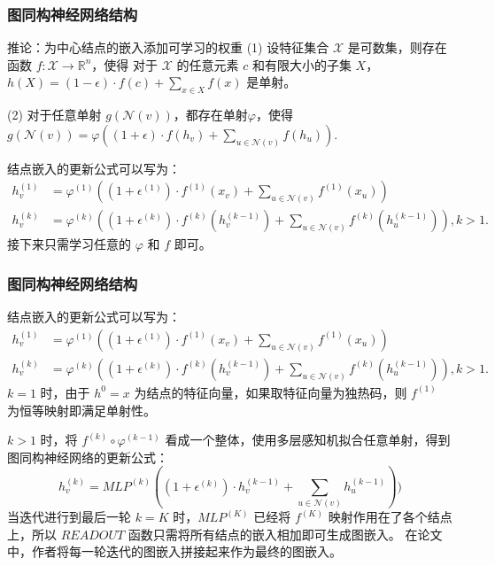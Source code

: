 \documentclass{beamer}
\begin{document}
\begin{frame}

  \frametitle{图同构神经网络结构}
  \begin{alertblock}{推论：为中心结点的嵌入添加可学习的权重}
    (1) 设特征集合 $\mathcal{X}$ 是可数集，则存在函数 $f: \mathcal{X} \rightarrow \mathbb{R}^n$，使得
    对于 $\mathcal{X}$ 的任意元素 $c$ 和有限大小的子集 $X$，$h(X) = (1 - \epsilon) \cdot f(c) + \sum_{x \in X} f(x)$ 是单射。
    
    (2) 对于任意单射 $g(\mathcal{N}(v))$，都存在单射$\varphi$，使得 $g(\mathcal{N}(v)) = \varphi((1 + \epsilon) \cdot f(h_v) + \sum_{u \in \mathcal{N}(v)} f(h_u))$.
  \end{alertblock}
  结点嵌入的更新公式可以写为：
  \begin{align*}
    h_v^{(1)} &= \varphi^{(1)}((1 + \epsilon^{(1)}) \cdot f^{(1)}(x_v) + \sum_{u \in \mathcal{N}(v)} f^{(1)}(x_u)) \\
    h_v^{(k)} &= \varphi^{(k)}((1 + \epsilon^{(k)}) \cdot f^{(k)}(h^{(k-1)}_v) + \sum_{u \in \mathcal{N}(v)} f^{(k)}(h^{(k-1)}_u)), k > 1.
  \end{align*}
  接下来只需学习任意的 $\varphi$ 和 $f$ 即可。

\end{frame}

\begin{frame}

  \frametitle{图同构神经网络结构}
  结点嵌入的更新公式可以写为：
  \begin{align*}
    h_v^{(1)} &= \varphi^{(1)}((1 + \epsilon^{(1)}) \cdot f^{(1)}(x_v) + \sum_{u \in \mathcal{N}(v)} f^{(1)}(x_u)) \\
    h_v^{(k)} &= \varphi^{(k)}((1 + \epsilon^{(k)}) \cdot f^{(k)}(h^{(k-1)}_v) + \sum_{u \in \mathcal{N}(v)} f^{(k)}(h^{(k-1)}_u)), k > 1.
  \end{align*}
  $k = 1$ 时，由于 $h^0 = x$ 为结点的特征向量，如果取特征向量为独热码，则 $f^{(1)}$ 为恒等映射即满足单射性。

  $k > 1$ 时，将 $f^{(k)} \circ \varphi^{(k-1)}$ 看成一个整体，使用多层感知机拟合任意单射，得到图同构神经网络的更新公式：
  $$
    h_v^{(k)} = MLP^{(k)} ((1 + \epsilon^{(k)}) \cdot h_v^{(k-1)} + \sum_{u \in \mathcal{N}(v)} h^{(k-1)}_u))
  $$
  当迭代进行到最后一轮 $k = K$ 时，$MLP^{(K)}$ 已经将 $f^{(K)}$ 映射作用在了各个结点上，所以 $READOUT$ 函数只需将所有结点的嵌入相加即可生成图嵌入。
  在论文中，作者将每一轮迭代的图嵌入拼接起来作为最终的图嵌入。
  

\end{frame}
\end{document}
